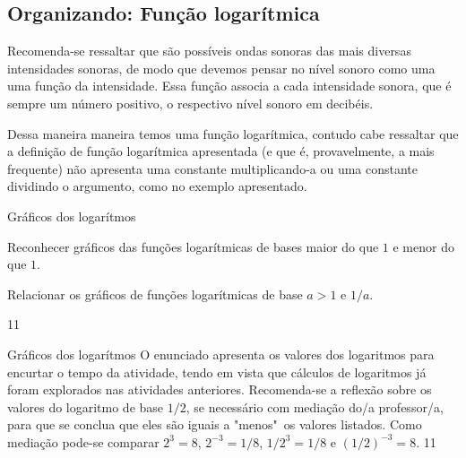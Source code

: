 \marginpar{\vspace{2em}}
\def\currentcolor{session4}
\begin{texto}
{
	\section{Organizando: Função logarítmica}
	Recomenda-se ressaltar que são possíveis ondas sonoras das mais diversas intensidades sonoras, de modo que devemos pensar no nível sonoro como uma uma função da intensidade. Essa função associa a cada intensidade sonora, que é sempre um número positivo, o respectivo nível sonoro em decibéis.

	Dessa maneira maneira temos uma função logarítmica, contudo cabe ressaltar que a definição de função logarítmica apresentada (e que é, provavelmente, a mais frequente) não apresenta uma constante multiplicando-a ou uma constante dividindo o argumento, como no exemplo apresentado.
}
\end{texto}
\clearmargin
\begin{objectives}{Gráficos dos logarítmos}
{
	Reconhecer gráficos das funções logarítmicas de bases maior do que $1$ e menor do que $1$.

Relacionar os gráficos de funções logarítmicas de base $a>1$ e $1/a$.
}{1}{1}
\end{objectives}
\begin{sugestions}{Gráficos dos logarítmos}
{
	O enunciado apresenta os valores dos logaritmos para encurtar o tempo da atividade, tendo em vista que cálculos de logaritmos já foram explorados nas atividades anteriores. Recomenda-se a reflexão sobre os valores do logaritmo de base $1/2$, se necessário com mediação do/a  professor/a, para que se conclua que eles são iguais a "menos"\, os valores listados. Como mediação pode-se comparar $2^3=8$, $2^{-3}=1/8$, $1/2^3=1/8$ e $(1/2)^{-3}=8$.
}{1}{1}
\end{sugestions}

